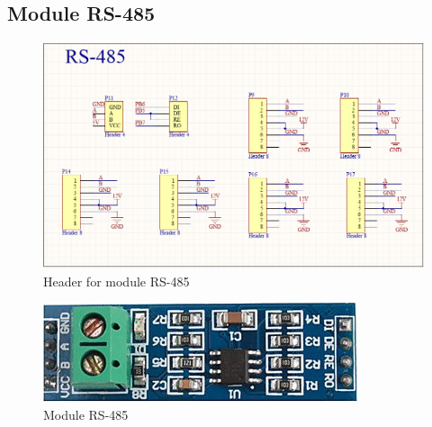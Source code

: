       \subsection{Module RS-485}
      \begin{figure}[!ht]
        \begin{center}
        \includegraphics[scale=0.63]{images/header485.PNG}
        \caption{Header for module RS-485}
        \label{fig:header485}
        \end{center}
      \end{figure}
      \begin{figure}[!ht]
        \begin{center}
        \includegraphics[scale=1]{images/module-rs485.png}
        \caption{Module RS-485}
        \label{fig:module485}
        \end{center}
      \end{figure}

